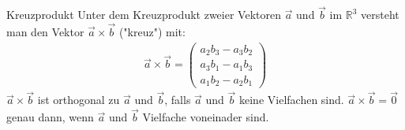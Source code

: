 \documentclass{article}
\begin{document}
\begin{boxx}[Red]{Kreuzprodukt}
    Unter dem Kreuzprodukt zweier Vektoren $\vec{a}$ und $\vec{b}$ im $\mathbb{R}^3$
    versteht man den Vektor $\vec{a} \times \vec{b}$ ("kreuz") mit:
    \begin{align*}
        \vec{a} \times \vec{b} = \begin{pmatrix}
            a_2b_3 - a_3b_2 \\
            a_3b_1 - a_1b_3 \\
            a_1b_2 - a_2b_1
        \end{pmatrix}
    \end{align*}
    $\vec{a} \times \vec{b}$ ist orthogonal zu $\vec{a}$ und $\vec{b}$, 
    falls $\vec{a}$ und $\vec{b}$ keine Vielfachen sind.
    $\vec{a} \times \vec{b} = \vec{0}$ genau dann, wenn $\vec{a}$ und $\vec{b}$ Vielfache voneinader sind.
\end{boxx}
\end{document}
